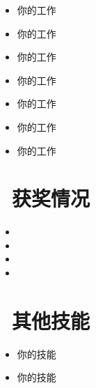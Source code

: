 \documentclass[fontset=windows,a4paper,oneside,10pt]{article}
\begin{document}
\begin{onehalfspacing}
\begin{itemize}[parsep=0.5ex]
  \item 你的工作
  \item 你的工作
  \item 你的工作
\end{itemize}
\end{onehalfspacing}

\begin{onehalfspacing}
\begin{itemize}[parsep=0.5ex]
  \item 你的工作
  \item 你的工作
  \item 你的工作
  \item 你的工作
\end{itemize}
\end{onehalfspacing}

\section{\faTrophy\ 获奖情况}
\begin{itemize}[parsep=0.5ex]
  \item {}
  \item {}
  \item {}
  \item {}
\end{itemize}

\section{\faCogs\ 其他技能}
\begin{itemize}[parsep=0.5ex]
  \item 你的技能
  \item 你的技能
\end{itemize}
\end{document}
